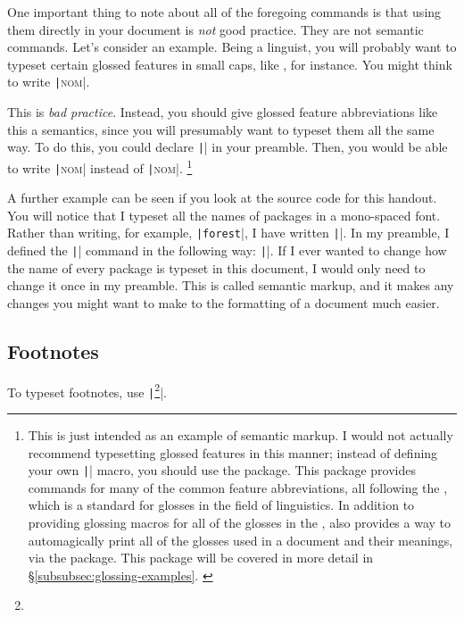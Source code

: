 One important thing to note about all of the foregoing commands is that using them directly in your document is \emph{not} good practice.
They are not semantic commands.
Let's consider an example.
Being a linguist, you will probably want to typeset certain glossed features in small caps, like \Nom, for instance.
You might think to write \texttt|\textsc{nom}|.

This is \emph{bad practice}.
Instead, you should give glossed feature abbreviations like this a semantics, since you will presumably want to typeset them all the same way.
To do this, you could declare \texttt|\newcommand*{\Fts}[1]{\textsc{#1}}| in your preamble.
Then, you would be able to write \texttt|\Fts{nom}| instead of \texttt|\textsc{nom}|.%
\footnote{%
This is just intended as an example of semantic markup.
I would not actually recommend typesetting glossed features in this manner; instead of defining your own \texttt|\Fts| macro, you should use the  package.
This package provides commands for many of the common feature abbreviations, all following the \LGR, which is a standard for glosses in the field of linguistics.
In addition to providing glossing macros for all of the glosses in the \LGR,  also provides a way to automagically print all of the glosses used in a document and their meanings, via the  package.
This package will be covered in more detail in \S\ref{subsubsec:glossing-examples}.
\label{fn:leipzig}%
}

A further example can be seen if you look at the source code for this handout.
You will notice that I typeset all the names of packages in a mono-spaced font.
Rather than writing, for example, \texttt|\texttt{forest}|, I have written \texttt||.
In my preamble, I defined the \texttt|\Package{}| command in the following way: \texttt|\newcommand*{\Package}[1]{\texttt{#1}}|.
If I ever wanted to change how the name of every package is typeset in this document, I would only need to change it once in my preamble.
This is called semantic markup, and it makes any changes you might want to make to the formatting of a document much easier.

\subsection{Footnotes}
\label{subsec:footnotes}

To typeset footnotes, use \texttt|\footnote{}|.

